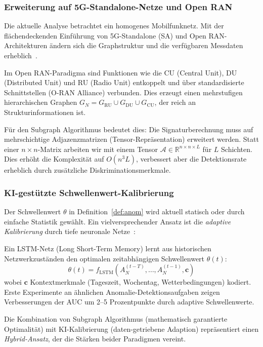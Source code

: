 ﻿\documentclass[a4paper,12pt]{article}
\theoremstyle{definition}
\begin{document}
\subsubsection{Erweiterung auf 5G-Standalone-Netze und Open RAN}

Die aktuelle Analyse betrachtet ein homogenes Mobilfunknetz. Mit der fl\"achendeckenden
Einf\"uhrung von 5G-Standalone (SA) und Open RAN-Architekturen \"andern sich die
Graphstruktur und die verf\"ugbaren Messdaten erheblich~\cite{openran2024}.

Im Open RAN-Paradigma sind Funktionen wie die CU (Central Unit), DU (Distributed Unit)
und RU (Radio Unit) entkoppelt und \"uber standardisierte Schnittstellen (O-RAN
Alliance) verbunden. Dies erzeugt einen mehrstufigen hierarchischen Graphen
$G_N = G_{\mathrm{RU}} \cup G_{\mathrm{DU}} \cup G_{\mathrm{CU}}$, der reich an
Strukturinformationen ist.

F\"ur den Subgraph Algorithmus bedeutet dies: Die Signaturberechnung muss auf
mehrschichtige Adjazenzmatrizen (Tensor-Repr\"asentation) erweitert werden.
Statt einer $n \times n$-Matrix arbeiten wir mit einem Tensor
$\mathcal{A} \in \mathbb{R}^{n \times n \times L}$ f\"ur $L$ Schichten.
Dies erh\"oht die Komplexit\"at auf $O(n^3 L)$, verbessert aber die
Detektionsrate erheblich durch zus\"atzliche Diskriminationsmerkmale.

\subsubsection{KI-gest\"utzte Schwellenwert-Kalibrierung}

Der Schwellenwert $\theta$ in Definition~\ref{def:anom} wird aktuell statisch
oder durch einfache Statistik gew\"ahlt. Ein vielversprechender Ansatz ist die
\emph{adaptive Kalibrierung} durch tiefe neuronale Netze~\cite{lecun2015deep}:

Ein LSTM-Netz (Long Short-Term Memory) lernt aus historischen Netzwerkzust\"anden
den optimalen zeitabh\"angigen Schwellenwert $\theta(t)$:
\[
\theta(t) = f_{\mathrm{LSTM}}(A_N^{(t-T)}, \ldots, A_N^{(t-1)}, \mathbf{c})
\]
wobei $\mathbf{c}$ Kontextmerkmale (Tageszeit, Wochentag, Wetterbedingungen)
kodiert. Erste Experimente an \"ahnlichen Anomalie-Detektionsaufgaben zeigen
Verbesserungen der AUC um 2--5 Prozentpunkte durch adaptive Schwellenwerte.

Die Kombination von Subgraph Algorithmus (mathematisch garantierte Optimalit\"at)
mit KI-Kalibrierung (daten-getriebene Adaption) repr\"asentiert einen
\emph{Hybrid-Ansatz}, der die St\"arken beider Paradigmen vereint.
\end{document}
